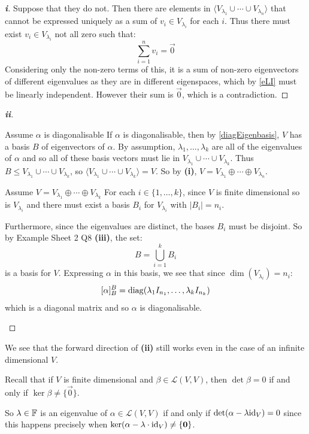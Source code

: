 \documentclass[../main.tex]{subfiles}
\begin{document}
\begin{proof}[\textbf{i}]
  Suppose that they do not.
  Then there are elements in $\langle V_{\lambda_1} \cup \cdots \cup V_{\lambda_n} \rangle$ that cannot be expressed uniquely as a sum of $v_i \in V_{\lambda_i}$ for each $i$.
  Thus there must exist $v_i \in V_{\lambda_i}$ not all zero such that:
  \[
    \sum_{i = 1}^{n} v_i = \vec{0}
  \]
  Considering only the non-zero terms of this, it is a sum of non-zero eigenvectors of different eigenvalues as they are in different eigenspaces, which by \cref{eLI} must be linearly independent.
  However their sum is $\vec{0}$, which is a contradiction.
\end{proof}
\begin{proof}[\textbf{ii}]
  \begin{proofdirection}{Assume $\alpha$ is diagonalisable}
    If $\alpha$ is diagonalisable, then by \cref{diagEigenbasis}, $V$ has a basis $B$ of eigenvectors of $\alpha$.
    By assumption, $\lambda_1, \ldots, \lambda_k$ are all of the eigenvalues of $\alpha$ and so all of these basis vectors must lie in $V_{\lambda_1} \cup \cdots \cup V_{\lambda_k}$.
    Thus $B \leq V_{\lambda_1} \cup \cdots \cup V_{\lambda_k}$, so $\langle V_{\lambda_1} \cup \cdots \cup V_{\lambda_k} \rangle = V$.
    So by \textbf{(i)}, $V = V_{\lambda_1} \oplus \cdots \oplus V_{\lambda_n}$.
  \end{proofdirection}
  \begin{proofdirection}{Assume $V = V_{\lambda_1} \oplus \cdots \oplus V_{\lambda_k}$}
    For each $i \in \{1, \ldots, k\}$, since $V$ is finite dimensional so is $V_{\lambda_i}$ and there must exist a basis $B_i$ for $V_{\lambda_i}$ with $|B_i| = n_i$.

    Furthermore, since the eigenvalues are distinct, the bases $B_i$ must be disjoint.
    So by Example Sheet 2 Q8 \textbf{(iii)}, the set:
    \[
      B = \bigcup_{i = 1}^{k} B_i
    \]
    is a basis for $V$.
    Expressing $\alpha$ in this basis, we see that since $\dim(V_{\lambda_i}) = n_i$:
    \[
      [\alpha]^{B}_{B} = \operatorname{diag}(\lambda_1 I_{n_1}, \ldots, \lambda_k I_{n_k})
    \]
    which is a diagonal matrix and so $\alpha$ is diagonalisable.
  \end{proofdirection}
\end{proof}
\begin{remark}
  We see that the forward direction of \textbf{(ii)} still works even in the case of an infinite dimensional $V$.
\end{remark}
\begin{remark}[Recap]
  Recall that if $V$ is finite dimensional and $\beta \in \mathcal{L}(V, V)$, then $\det \beta = 0$ if and only if $\ker \beta \neq \{\vec{0}\}$.
\end{remark}
So $\lambda \in \mathbb{F}$ is an eigenvalue of $\alpha \in \mathcal{L}(V, V)$ if and only if $\det(\alpha - \lambda \mathrm{id}_V) = 0$ since this happens precisely when $\ker(\alpha - \lambda \cdot \mathrm{id}_V) \neq \{\mathbf{\bm{0}}\}$.
\end{document}
